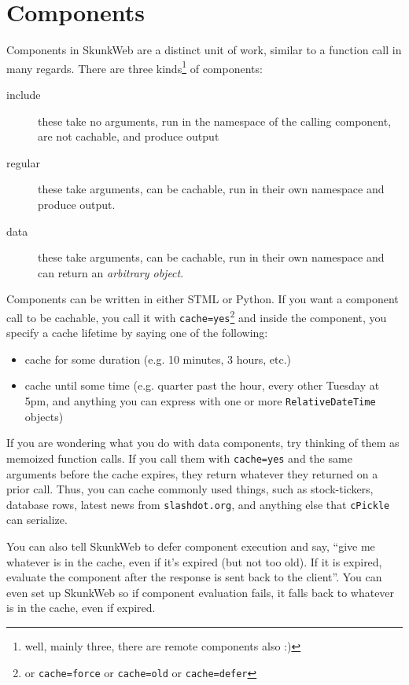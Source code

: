 \documentclass[twocolumn]{article}
\begin{document}
\section{Components}
\label{components}
Components in SkunkWeb are a distinct unit of work, similar to a
function call in many regards.  There are three kinds\footnote{well, mainly three, there are remote components also :)} of components:
\begin{description}
\item[include] these take no arguments, run in the namespace of the
calling component, are not cachable, and produce output
\item[regular] these take arguments, can be cachable, run in their own
namespace and produce output.
\item[data] these take arguments, can be cachable, run in their own
namespace and can return an \emph{arbitrary object}.
\end{description}

Components can be written in either STML or Python.  If you want a
component call to be cachable, you call it with \texttt{cache=yes}\footnote{or \texttt{cache=force} or \texttt{cache=old} or \texttt{cache=defer}} and
inside the component, you specify a cache lifetime by saying one of
the following:
\begin{itemize}
\item cache for some duration (e.g. 10 minutes, 3 hours, etc.)
\item cache until some time (e.g. quarter past the hour, every other
Tuesday at 5pm, and anything you can express with one or more
\texttt{RelativeDateTime} objects)
\end{itemize}

If you are wondering what you do with data components, try thinking of them
as memoized function calls.  If you call them with \texttt{cache=yes}
and the same arguments before the cache expires, they return
whatever they returned on a prior call.  Thus, you can cache commonly used
things, such as stock-tickers, database rows, latest news from
\texttt{slashdot.org}, and anything else that \texttt{cPickle} can
serialize.

You can also tell SkunkWeb to defer component execution and say,
``give me whatever is in the cache, even if it's expired (but not too
old). If it is expired, evaluate the component after the response
is sent back to the client''.  You can even set up SkunkWeb so if
component evaluation fails, it falls back to whatever is in the cache,
even if expired.
\end{document}
